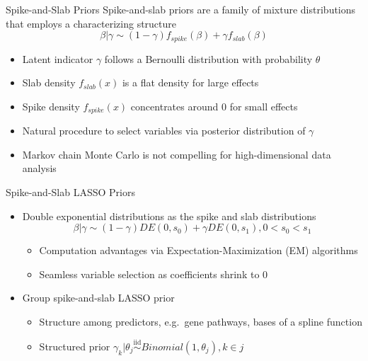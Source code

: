 \documentclass[
  ignorenonframetext,
  aspectratio=169]{beamer}
\providecommand{\tightlist}{%
  \setlength{\itemsep}{0pt}\setlength{\parskip}{0pt}}
\newcommand{\simiid}{\overset{\text{iid}}{\sim}}
\begin{document}
\begin{frame}{Spike-and-Slab Priors}
\protect\hypertarget{spike-and-slab-priors}{}
Spike-and-slab priors are a family of mixture distributions that employs
a characterizing structure
\[\beta|\gamma \sim (1-\gamma)f_{spike}(\beta) + \gamma f_{slab}(\beta)\]

\begin{itemize}
\item
  Latent indicator \(\gamma\) follows a Bernoulli distribution with
  probability \(\theta\)
\item
  Slab density \(f_{slab}(x)\) is a flat density for large effects
\item
  Spike density \(f_{spike}(x)\) concentrates around 0 for small effects
\item
  Natural procedure to select variables via posterior distribution of
  \(\gamma\)
\item
  Markov chain Monte Carlo is not compelling for high-dimensional data
  analysis
\end{itemize}
\end{frame}

\begin{frame}{Spike-and-Slab LASSO Priors}
\protect\hypertarget{spike-and-slab-lasso-priors}{}
\begin{itemize}
\tightlist
\item
  Double exponential distributions as the spike and slab distributions
  \[\beta|\gamma \sim (1-\gamma)DE(0, s_0) + \gamma DE(0, s_1), 0 < s_0 < s_1\]

  \begin{itemize}
  \tightlist
  \item
    Computation advantages via Expectation-Maximization (EM) algorithms
  \item
    Seamless variable selection as coefficients shrink to 0
  \end{itemize}
\item
  Group spike-and-slab LASSO prior

  \begin{itemize}
  \tightlist
  \item
    Structure among predictors, e.g.~gene pathways, bases of a spline
    function
  \item
    Structured prior
    \(\gamma_k | \theta_j \simiid Binomial(1, \theta_j), k \in j\)
  \end{itemize}
\end{itemize}
\end{frame}
\end{document}
